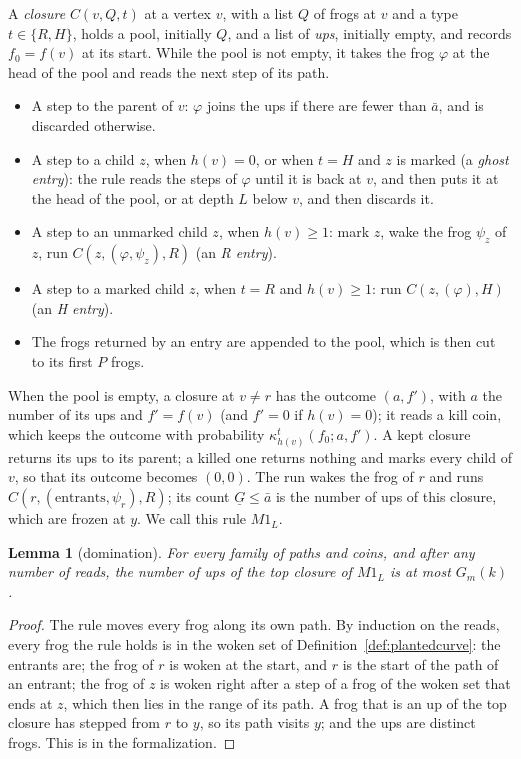 \documentclass[11pt]{amsart}
\newtheorem{lemma}[theorem]{Lemma}
\theoremstyle{definition}
\numberwithin{equation}{section}
\newcommand{\lean}[1]{\ignorespaces}
\begin{document}
A \emph{closure} $C(v,Q,t)$ at a vertex $v$, with a list $Q$ of frogs at $v$ and a type $t\in\{R,H\}$, holds a pool, initially $Q$, and a list of \emph{ups}, initially empty, and records $f_0=f(v)$ at its start. While the pool is not empty, it takes the frog $\varphi$ at the head of the pool and reads the next step of its path.
\begin{itemize}
\item A step to the parent of $v$: $\varphi$ joins the ups if there are fewer than $\bar a$, and is discarded otherwise.
\item A step to a child $z$, when $h(v)=0$, or when $t=H$ and $z$ is marked (a \emph{ghost entry}): the rule reads the steps of $\varphi$ until it is back at $v$, and then puts it at the head of the pool, or at depth $L$ below $v$, and then discards it.
\item A step to an unmarked child $z$, when $h(v)\ge1$: mark $z$, wake the frog $\psi_z$ of $z$, run $C(z,(\varphi,\psi_z),R)$ (an \emph{R entry}).
\item A step to a marked child $z$, when $t=R$ and $h(v)\ge1$: run $C(z,(\varphi),H)$ (an \emph{H entry}).
\item The frogs returned by an entry are appended to the pool, which is then cut to its first $P$ frogs.
\end{itemize}
When the pool is empty, a closure at $v\ne r$ has the outcome $(a,f')$, with $a$ the number of its ups and $f'=f(v)$ (and $f'=0$ if $h(v)=0$); it reads a kill coin, which keeps the outcome with probability $\kappa^t_{h(v)}(f_0;a,f')$. A kept closure returns its ups to its parent; a killed one returns nothing and marks every child of $v$, so that its outcome becomes $(0,0)$. The run wakes the frog of $r$ and runs $C(r,(\text{entrants},\psi_r),R)$; its count $\underline G\le \bar a$ is the number of ups of this closure, which are frozen at $y$. We call this rule $M1_L$.

\begin{lemma}[domination]\label{lem:dom}\lean{FrogModel.D3.f1_gen}
For every family of paths and coins, and after any number of reads, the number of ups of the top closure of $M1_L$ is at most $G_m(k)$.
\end{lemma}

\begin{proof}
The rule moves every frog along its own path. By induction on the reads, every frog the rule holds is in the woken set of Definition~\ref{def:plantedcurve}: the entrants are; the frog of $r$ is woken at the start, and $r$ is the start of the path of an entrant; the frog of $z$ is woken right after a step of a frog of the woken set that ends at $z$, which then lies in the range of its path. A frog that is an up of the top closure has stepped from $r$ to $y$, so its path visits $y$; and the ups are distinct frogs. This is  in the formalization.
\end{proof}
\end{document}
